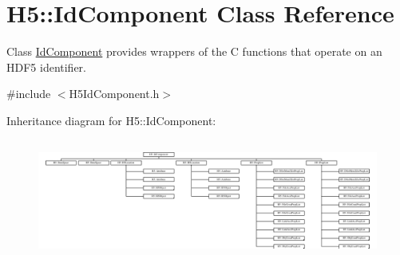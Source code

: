 \hypertarget{class_h5_1_1_id_component}{}\section{H5\+:\+:Id\+Component Class Reference}
\label{class_h5_1_1_id_component}


Class \hyperlink{class_h5_1_1_id_component}{Id\+Component} provides wrappers of the C functions that operate on an H\+D\+F5 identifier.  




{\ttfamily \#include $<$H5\+Id\+Component.\+h$>$}

Inheritance diagram for H5\+:\+:Id\+Component\+:\begin{figure}[H]
\begin{center}
\leavevmode
\includegraphics[height=4.023952cm]{class_h5_1_1_id_component}
\end{center}
\end{figure}
